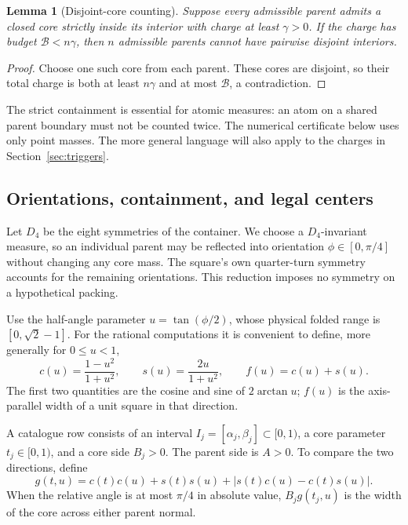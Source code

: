\documentclass[11pt]{article}
\newtheorem{lemma}[theorem]{Lemma}
\newcommand{\abs}[1]{\left|#1\right|}
\begin{document}
\begin{lemma}[Disjoint-core counting]\label{lem:budget}
Suppose every admissible parent admits a closed core strictly inside its
interior with charge at least $\gamma>0$. If the charge has budget
$\mathcal B<n\gamma$, then $n$ admissible parents cannot have pairwise
disjoint interiors.
\end{lemma}

\begin{proof}
Choose one such core from each parent. These cores are disjoint, so their
total charge is both at least $n\gamma$ and at most $\mathcal B$, a
contradiction.
\end{proof}

The strict containment is essential for atomic measures: an atom on a shared
parent boundary must not be counted twice. The numerical certificate below
uses only point masses. The more general language will also apply to the
charges in Section~\ref{sec:triggers}.

\subsection{Orientations, containment, and legal centers}

Let $D_4$ be the eight symmetries of the container. We choose a $D_4$-invariant
measure, so an individual parent may be reflected into orientation
$\phi\in[0,\pi/4]$ without changing any core mass. The square's own quarter-turn
symmetry accounts for the remaining orientations. This reduction imposes no
symmetry on a hypothetical packing.

Use the half-angle parameter $u=\tan(\phi/2)$, whose physical folded range is
$[0,\sqrt2-1]$. For the rational computations it is convenient to define,
more generally for $0\le u<1$,
\begin{equation}\label{eq:trig}
  c(u)=\frac{1-u^2}{1+u^2},\qquad
  s(u)=\frac{2u}{1+u^2},\qquad
  f(u)=c(u)+s(u).
\end{equation}
The first two quantities are the cosine and sine of $2\arctan u$; $f(u)$ is
the axis-parallel width of a unit square in that direction.

A catalogue row consists of an interval $I_j=[\alpha_j,\beta_j]\subset[0,1)$,
a core parameter $t_j\in[0,1)$, and a core side $B_j>0$. The parent side is
$A>0$. To compare the two directions, define
\begin{equation}\label{eq:g}
  g(t,u)=c(t)c(u)+s(t)s(u)+\abs{s(t)c(u)-c(t)s(u)}.
\end{equation}
When the relative angle is at most $\pi/4$ in absolute value, $B_jg(t_j,u)$
is the width of the core across either parent normal.
\end{document}
